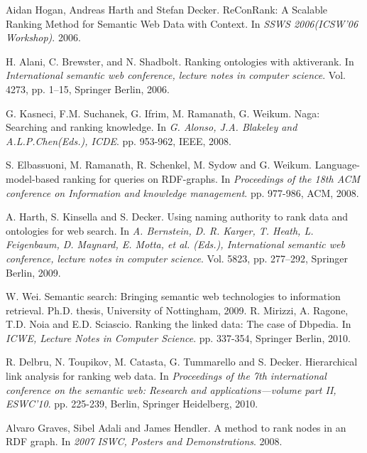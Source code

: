 \documentclass{article}
\begin{document}
\begin{thebibliography}{100}
        Aidan Hogan, Andreas Harth and Stefan Decker.
        ReConRank: A Scalable Ranking Method for Semantic Web Data with Context.
        In \emph{SSWS 2006(ICSW'06 Workshop)}.
        2006.

        H. Alani, C. Brewster, and N. Shadbolt.
        Ranking ontologies with aktiverank.
        In \emph{International semantic web conference, lecture notes in computer science}.
        Vol. 4273, pp. 1–15,
        Springer Berlin, 2006.

                G. Kasneci, F.M. Suchanek, G. Ifrim, M. Ramanath, G. Weikum.
        Naga: Searching and ranking knowledge.
        In \emph{G. Alonso, J.A. Blakeley and A.L.P.Chen(Eds.), ICDE}.
        pp. 953-962,
        IEEE, 2008.

        S. Elbassuoni, M. Ramanath, R. Schenkel, M. Sydow and G. Weikum.
        Language-model-based ranking for queries on RDF-graphs.
        In \emph{Proceedings of the 18th ACM conference on Information and knowledge management}.
        pp. 977-986,
        ACM, 2008.

        A. Harth, S. Kinsella and S. Decker.
        Using naming authority to rank data and ontologies for web search.
        In \emph{A. Bernstein, D. R. Karger, T. Heath, L. Feigenbaum, D. Maynard, E. Motta, et al. (Eds.), International semantic web conference, lecture notes in computer science}.
         Vol. 5823, pp. 277–292,
         Springer Berlin, 2009.

         W. Wei.
         Semantic search: Bringing semantic web technologies to information retrieval.
         Ph.D. thesis, University of Nottingham, 2009.
        R. Mirizzi, A. Ragone, T.D. Noia and E.D. Sciascio.
        Ranking the linked data: The case of Dbpedia.
        In \emph{ICWE, Lecture Notes in Computer Science}.
        pp. 337-354,
        Springer Berlin, 2010.

        R. Delbru, N. Toupikov, M. Catasta, G. Tummarello and S.  Decker.
        Hierarchical link analysis for ranking web data.
        In \emph{Proceedings of the 7th international conference on the semantic web: Research and applications—volume part II, ESWC’10}.
        pp. 225-239,
        Berlin,
        Springer Heidelberg, 2010.

        Alvaro Graves, Sibel Adali and James Hendler.
        A method to rank nodes in an RDF graph.
        In \emph{2007 ISWC, Posters and Demonstrations}.
        2008.


\end{thebibliography}
\end{document}
